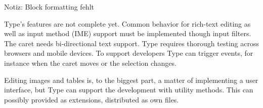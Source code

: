 Notiz: Block formatting fehlt

Type's features are not complete yet. Common behavior for rich-text editing as well as input method (IME) support must be implemented though input filters. The caret needs bi-directional text support. Type requires thorough testing across browsers and mobile devices. To support developers Type can trigger events, for instance when the caret moves or the selection changes.

Editing images and tables is, to the biggest part, a matter of implementing a user interface, but Type can support the development with utility methods. This can possibly provided as extensions, distributed as own files.














